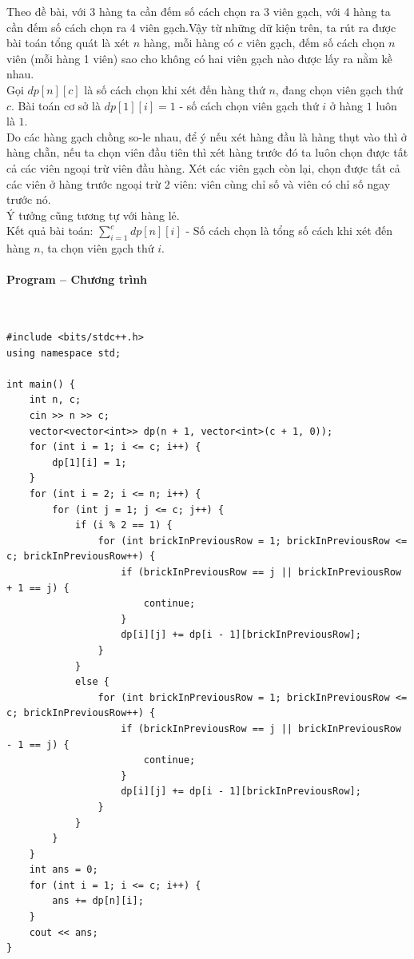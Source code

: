 \documentclass{article}
\begin{document}
Theo đề bài, với 3 hàng ta cần đếm số cách chọn ra 3 viên gạch, với 4 hàng ta cần đếm số cách chọn ra 4 viên gạch.Vậy từ những dữ kiện trên, ta rút ra được bài toán tổng quát là xét $n$ hàng, mỗi hàng có $c$ viên gạch, đếm số cách chọn $n$ viên (mỗi hàng 1 viên) sao cho không có hai viên gạch nào được lấy ra nằm kề nhau. \\

Gọi $dp[n][c]$ là số cách chọn khi xét đến hàng thứ $n$, đang chọn viên gạch thứ $c$. Bài toán cơ sở là $dp[1][i] = 1$ - số cách chọn viên gạch thứ $i$ ở hàng $1$ luôn là $1$.\\

Do các hàng gạch chồng so-le nhau, để ý nếu xét hàng đầu là hàng thụt vào thì ở hàng chẵn, nếu ta chọn viên đầu tiên thì xét hàng trước đó ta luôn chọn được tất cả các viên ngoại trừ viên đầu hàng. Xét các viên gạch còn lại, chọn được tất cả các viên ở hàng trước ngoại trừ 2 viên: viên cùng chỉ số và viên có chỉ số ngay trước nó. \\

Ý tưởng cũng tương tự với hàng lẻ. \\

Kết quả bài toán: $\sum_{i =1}^{c}dp[n][i]$ - Số cách chọn là tổng số cách khi xét đến hàng $n$, ta chọn viên gạch thứ $i$.\\



\paragraph{Program -- Chương trình} \mbox{} \\


\begin{lstlisting}
#include <bits/stdc++.h>
using namespace std;

int main() {
	int n, c;
	cin >> n >> c;
	vector<vector<int>> dp(n + 1, vector<int>(c + 1, 0));
	for (int i = 1; i <= c; i++) {
		dp[1][i] = 1;
	}
	for (int i = 2; i <= n; i++) {
		for (int j = 1; j <= c; j++) {
			if (i % 2 == 1) {
				for (int brickInPreviousRow = 1; brickInPreviousRow <= c; brickInPreviousRow++) {
					if (brickInPreviousRow == j || brickInPreviousRow + 1 == j) {
						continue;
					}
					dp[i][j] += dp[i - 1][brickInPreviousRow];
				}
			}
			else {
				for (int brickInPreviousRow = 1; brickInPreviousRow <= c; brickInPreviousRow++) {
					if (brickInPreviousRow == j || brickInPreviousRow - 1 == j) {
						continue;
					}
					dp[i][j] += dp[i - 1][brickInPreviousRow];
				}
			}
		}
	}
	int ans = 0;
	for (int i = 1; i <= c; i++) {
		ans += dp[n][i];
	}
	cout << ans;
}
	
\end{lstlisting}
\end{document}
